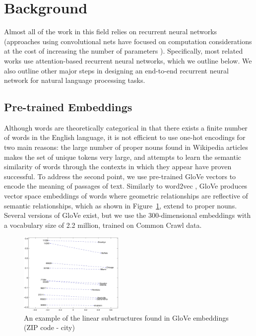 \documentclass{article}
\begin{document}
\section{Background} \label{background}
Almost all of the work in this field relies on recurrent neural networks (approaches using convolutional nets have focused on computation considerations at the cost of increasing the number of parameters \cite{CNN_QA}). Specifically, most related works use attention-based recurrent neural networks, which we outline below. We also outline other major steps in designing an end-to-end recurrent neural network for natural language processing tasks.

\subsection{Pre-trained Embeddings}
Although words are theoretically categorical in that there exists a finite number of words in the English language, it is not efficient to use one-hot encodings for two main reasons: the large number of proper nouns found in Wikipedia articles makes the set of unique tokens very large, and attempts to learn the semantic similarity of words through the contexts in which they appear have proven successful. To address the second point, we use pre-trained GloVe \cite{GloVe} vectors to encode the meaning of passages of text. Similarly to word2vec \cite{word2vec}, GloVe produces vector space embeddings of words where geometric relationships are reflective of semantic relationships, which as shown in Figure~\ref{fig:gloveExample}, extend to proper nouns. Several versions of GloVe exist, but we use the 300-dimensional embeddings with a vocabulary size of 2.2 million, trained on Common Crawl data.

\begin{figure}[h]
	\includegraphics[width=0.45\textwidth]{glove.jpg}
	\centering
	\caption{An example of the linear substructures found in GloVe embeddings (ZIP code - city)}
	\label{fig:gloveExample}
\end{figure} 
\end{document}
